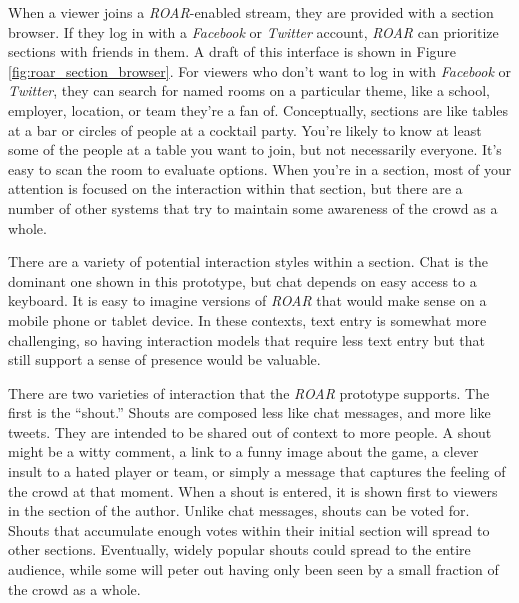 When a viewer joins a \emph{ROAR}-enabled stream, they are provided with a section browser. If they log in with a \emph{Facebook} or \emph{Twitter} account, \emph{ROAR} can prioritize sections with friends in them. A draft of this interface is shown in Figure \ref{fig:roar_section_browser}. For viewers who don't want to log in with \emph{Facebook} or \emph{Twitter}, they can search for named rooms on a particular theme, like a school, employer, location, or team they're a fan of. Conceptually, sections are like tables at a bar or circles of people at a cocktail party. You're likely to know at least some of the people at a table you want to join, but not necessarily everyone. It's easy to scan the room to evaluate options. When you're in a section, most of your attention is focused on the interaction within that section, but there are a number of other systems that try to maintain some awareness of the crowd as a whole. 

There are a variety of potential interaction styles within a section. Chat is the dominant one shown in this prototype, but chat depends on easy access to a keyboard. It is easy to imagine versions of \emph{ROAR} that would make sense on a mobile phone or tablet device. In these contexts, text entry is somewhat more challenging, so having interaction models that require less text entry but that still support a sense of presence would be valuable.

There are two varieties of interaction that the \emph{ROAR} prototype supports. The first is the ``shout.'' Shouts are composed less like chat messages, and more like tweets. They are intended to be shared out of context to more people. A shout might be a witty comment, a link to a funny image about the game, a clever insult to a hated player or team, or simply a message that captures the feeling of the crowd at that moment. When a shout is entered, it is shown first to viewers in the section of the author. Unlike chat messages, shouts can be voted for. Shouts that accumulate enough votes within their initial section will spread to other sections.  Eventually, widely popular shouts could spread to the entire audience, while some will peter out having only been seen by a small fraction of the crowd as a whole.

